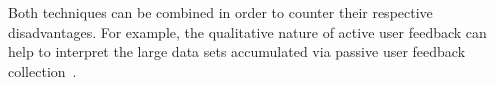 Both techniques can be combined in order to counter their respective disadvantages.
For example, the qualitative nature of active user feedback can help to interpret the large data sets accumulated via passive user feedback collection~\cite{Kelly:2003:IFI:959258.959260}.
%
%
%
%
%
%
%
%
